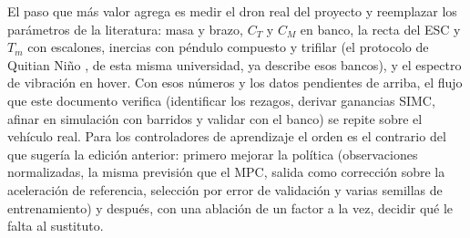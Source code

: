 El paso que más valor agrega es medir el dron real del proyecto y
reemplazar los parámetros de la literatura: masa y brazo, $C_T$ y $C_M$ en
banco, la recta del ESC y $T_m$ con escalones, inercias con péndulo
compuesto y trifilar (el protocolo de Quitian Niño \cite{quitian22}, de esta
misma universidad, ya describe esos bancos), y el espectro de vibración en
hover. Con esos números y los datos pendientes de arriba, el flujo que este
documento verifica (identificar los rezagos, derivar ganancias SIMC, afinar
en simulación con barridos y validar con el banco) se repite sobre el
vehículo real. Para los controladores de aprendizaje el orden es el
contrario del que sugería la edición anterior: primero mejorar la política
(observaciones normalizadas, la misma previsión que el MPC, salida como
corrección sobre la aceleración de referencia, selección por error de
validación y varias semillas de entrenamiento) y después, con una ablación
de un factor a la vez, decidir qué le falta al sustituto.
